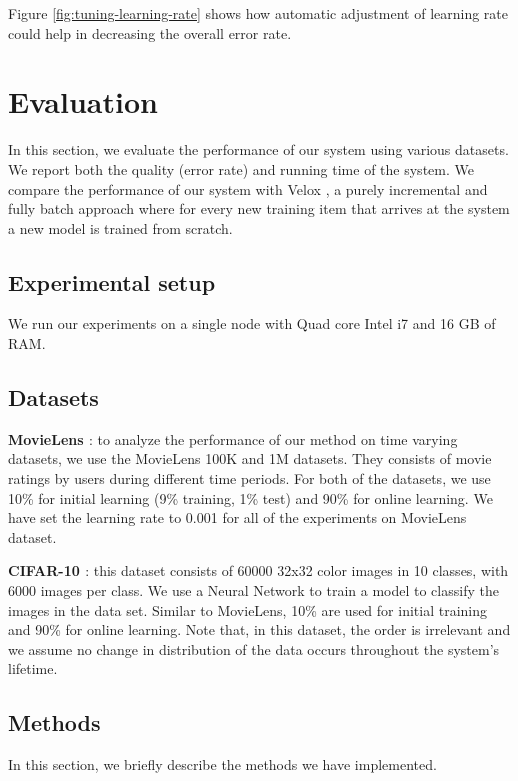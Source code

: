 \documentclass{sig-alternate-05-2015}
\begin{document}
Figure \ref{fig:tuning-learning-rate} shows how automatic adjustment of learning rate could help in decreasing the overall error rate.



\section{Evaluation} \label{evaluation}
In this section, we evaluate the performance of our system using various datasets. 
We report both the quality (error rate) and running time of the system. 
We compare the performance of our system with Velox \cite{crankshaw2014missing}, a purely incremental and fully batch approach where for every new training item that arrives at the system a new model is trained from scratch.

\subsection{Experimental setup}
We run our experiments on a single node with Quad core Intel i7 and 16 GB of RAM. 

\subsection{Datasets}
\textbf{MovieLens \cite{harper2016movielens}}: to analyze the performance of our method on time varying datasets, we use the MovieLens 100K and 1M datasets. 
They consists of movie ratings by users during different time periods. 
For both of the datasets, we use 10\% for initial learning (9\% training, 1\% test) and 90\% for online learning. 
We have set the learning rate to 0.001 for all of the experiments on MovieLens dataset.

\textbf{CIFAR-10 \cite{krizhevsky2009learning}}: this dataset consists of 60000 32x32 color images in 10 classes, with 6000 images per class. We use a Neural Network to train a model to classify the images in the data set. Similar to MovieLens, 10\% are used for initial training and 90\% for online learning. Note that, in this dataset, the order is irrelevant and we assume no change in distribution of the data occurs throughout the system's lifetime. 


\subsection{Methods}

In this section, we briefly describe the methods we have implemented.
\end{document}
